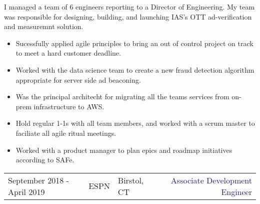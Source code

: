 \documentclass[12t]{article}
\begin{document}
\vspace{3pt} I managed a team of 6 engineers reporting to a Director of Engineering. My team was responsible for designing, building, and
launching IAS's OTT ad-verification and measuremnt solution. 
\begin{multicols}{2}
  \begin{small}
    \begin{itemize}[leftmargin=*,label=\tiny{$\bullet$}]
    \item\begin{minipage}[t]{\linewidth}{Sucessfully applied agile principles to bring an out of control project on track to meet a hard customer deadline.}\end{minipage}
    \item\begin{minipage}[t]{\linewidth}{Worked with the data science team to create a new fraud detection algorithm appropriate for server side ad beaconing.}\end{minipage}
    \item\begin{minipage}[t]{\linewidth}{Was the principal architecht for migrating all the teams services from on-prem infrastructure to AWS.}\end{minipage}
    \item\begin{minipage}[t]{\linewidth}{Hold regular 1-1s with all team members, and worked with a scrum master to faciliate all agile ritual meetings.}\end{minipage}
    \item\begin{minipage}[t]{\linewidth}{Worked with a product manager to plan epics and roadmap initiatives according to SAFe.}\end{minipage}
    \end{itemize}
  \end{small} 
\end{multicols}

\vspace{15pt}\begin{tabularx}{\textwidth}{@{}lllXr}
  September 2018 - April 2019&\textcolor{Mahogany}{ESPN}&\textcolor{Black!80}{Birstol, CT}&&\textcolor{MidnightBlue}{Associate Development Engineer}
\end{tabularx}
\end{document}
